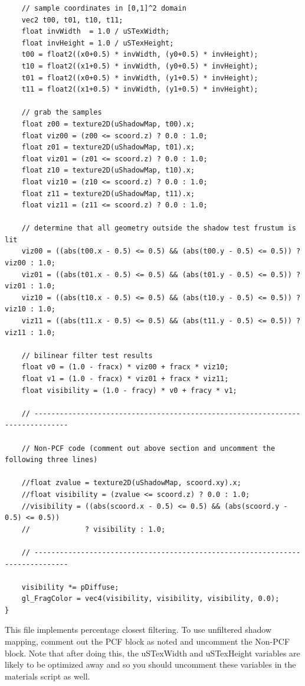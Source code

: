 \documentclass[]{article}  %
\begin{document}
\begin{verbatim}
    // sample coordinates in [0,1]^2 domain
    vec2 t00, t01, t10, t11;
    float invWidth  = 1.0 / uSTexWidth;
    float invHeight = 1.0 / uSTexHeight;
    t00 = float2((x0+0.5) * invWidth, (y0+0.5) * invHeight);
    t10 = float2((x1+0.5) * invWidth, (y0+0.5) * invHeight);
    t01 = float2((x0+0.5) * invWidth, (y1+0.5) * invHeight);
    t11 = float2((x1+0.5) * invWidth, (y1+0.5) * invHeight);
    
    // grab the samples
    float z00 = texture2D(uShadowMap, t00).x;
    float viz00 = (z00 <= scoord.z) ? 0.0 : 1.0;
    float z01 = texture2D(uShadowMap, t01).x;
    float viz01 = (z01 <= scoord.z) ? 0.0 : 1.0;
    float z10 = texture2D(uShadowMap, t10).x;
    float viz10 = (z10 <= scoord.z) ? 0.0 : 1.0;
    float z11 = texture2D(uShadowMap, t11).x;
    float viz11 = (z11 <= scoord.z) ? 0.0 : 1.0;

    // determine that all geometry outside the shadow test frustum is lit
    viz00 = ((abs(t00.x - 0.5) <= 0.5) && (abs(t00.y - 0.5) <= 0.5)) ? viz00 : 1.0;
    viz01 = ((abs(t01.x - 0.5) <= 0.5) && (abs(t01.y - 0.5) <= 0.5)) ? viz01 : 1.0;
    viz10 = ((abs(t10.x - 0.5) <= 0.5) && (abs(t10.y - 0.5) <= 0.5)) ? viz10 : 1.0; 
    viz11 = ((abs(t11.x - 0.5) <= 0.5) && (abs(t11.y - 0.5) <= 0.5)) ? viz11 : 1.0;

    // bilinear filter test results
    float v0 = (1.0 - fracx) * viz00 + fracx * viz10;
    float v1 = (1.0 - fracx) * viz01 + fracx * viz11;
    float visibility = (1.0 - fracy) * v0 + fracy * v1;

    // ------------------------------------------------------------------------------

    // Non-PCF code (comment out above section and uncomment the following three lines)

    //float zvalue = texture2D(uShadowMap, scoord.xy).x;
    //float visibility = (zvalue <= scoord.z) ? 0.0 : 1.0;
    //visibility = ((abs(scoord.x - 0.5) <= 0.5) && (abs(scoord.y - 0.5) <= 0.5)) 
    //             ? visibility : 1.0;
    
    // ------------------------------------------------------------------------------

    visibility *= pDiffuse;
    gl_FragColor = vec4(visibility, visibility, visibility, 0.0);
}
\end{verbatim}
This file implements percentage closest filtering.  To use unfiltered shadow mapping, comment out the PCF block as noted and uncomment the Non-PCF block.  Note that after doing this, the uSTexWidth and uSTexHeight variables are likely to be optimized away and so you should uncomment these variables in the materials script as well.  
\end{document}
